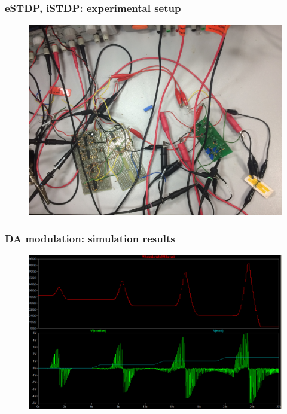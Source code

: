 \documentclass[12pt, aspectratio=169]{beamer}
\begin{document}
\begin{frame}
  \frametitle{eSTDP, iSTDP: experimental setup}
\begin{figure}
\includegraphics[width=0.65\linewidth]{mscs_experimental_setup}
\end{figure}
\end{frame}


\begin{frame}
\frametitle{DA modulation: simulation results}
\begin{figure}
\includegraphics[width=0.8\linewidth]{da_modulation}
\end{figure}
\end{frame}

\end{document}
